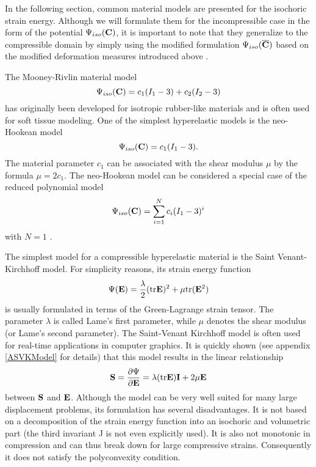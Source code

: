 In the following section, common material models are presented for the isochoric strain energy. Although we will formulate them for the incompressible case in the form of the potential $\Psi _{iso} (\mathbf {C} ) $, it is important to note that they generalize to the compressible domain by simply using the modified formulation $\Psi _{iso} (\mathbf {\overline{C} }) $ based on the modified deformation measures introduced above \cite{Holzapfel2000}.

The Mooney-Rivlin material model 
 \begin{equation}
 \Psi _{iso} (\mathbf {C}  )  = c_1 (I_1 -3 ) + c_2 (I_2-3)
\end{equation}
has originally been developed for isotropic rubber-like materials and is often used for soft tissue modeling. One of the simplest hyperelastic models is the neo-Hookean model
 \begin{equation}
 \Psi _{iso} (\mathbf {C}  )  = c_1 (I_1 -3 ).
\end{equation}
The material parameter $c_1$ can be associated with the shear modulus $\mu$ by the formula $\mu = 2c_1$. The neo-Hookean model can be considered a special case of the reduced polynomial model
 \begin{equation}
 \Psi _{iso} (\mathbf {C} )  = \sum _{i=1} ^N c_i (I_1 -3 )^i
\label{ReducedPolynomialModel}
\end{equation}
with $N=1$ \cite{Raghunathan2010}. 

The simplest model for a compressible hyperelastic material is the Saint Venant-Kirchhoff model. For simplicity reasons, its strain energy function
 \begin{equation}
 \Psi  (\mathbf {E}  )  = \frac{\lambda}{2} (\textnormal{tr}  \mathbf {E} )^2  + \mu \textnormal{tr}  (\mathbf {E} ^2) 
\end{equation}
 is usually formulated in terms of the Green-Lagrange strain tensor. The parameter $\lambda$ is called Lame's first parameter, while $\mu$ denotes the shear modulus (or Lame's second parameter). The Saint-Venant Kirchhoff model is often used for real-time applications in computer graphics. It is quickly shown (see appendix \ref{ASVKModel} for details) that this model results in the linear relationship
 \begin{equation}
 \mathbf {S}  = \frac{\partial \Psi}{\partial \mathbf {E} } = \lambda (\textnormal{tr} {\ensuremath{\mathbf {E} }})  \mathbf {I } + 2\mu \mathbf {E} 
\label{SaintVenantKirchhoff}
\end{equation}
between $\mathbf {S} $ and $\mathbf {E} $. Although the model can be very well suited for many large displacement problems, its formulation has several disadvantages. It is not based on a decomposition of the strain energy function into an isochoric and volumetric part (the third invariant J is not even explicitly used). It is also not monotonic in compression and can thus break down for large compressive strains. Consequently it does not satisfy the polyconvexity condition.



